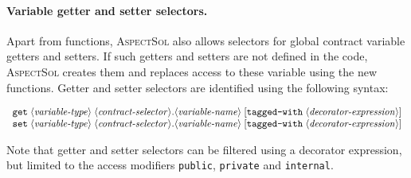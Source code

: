 \documentclass{article}
\newcommand{\AspectSol}{\textsc{AspectSol}\xspace}
\newcommand{\variable}[1]{\ensuremath{\langle\textrm{\textit{#1}}\rangle}}
\begin{document}


\paragraph{Variable getter and setter selectors.}
Apart from functions, \AspectSol also allows selectors for global contract variable getters and setters. If such getters and setters are not defined in the code, \AspectSol creates them and replaces access to these variable using the new functions. Getter and setter selectors are identified using the following syntax:

\[\begin{array}{l}
\texttt{get}\;\variable{variable-type}\;\variable{contract-selector}.\variable{variable-name}\;[\texttt{tagged-with}\;\variable{decorator-expression}]\\
\texttt{set}\;\variable{variable-type}\;\variable{contract-selector}.\variable{variable-name}\;[\texttt{tagged-with}\;\variable{decorator-expression}]
\end{array}\]

Note that getter and setter selectors can be filtered using a decorator expression, but limited to the access modifiers \texttt{public}, \texttt{private} and \texttt{internal}.
\end{document}
